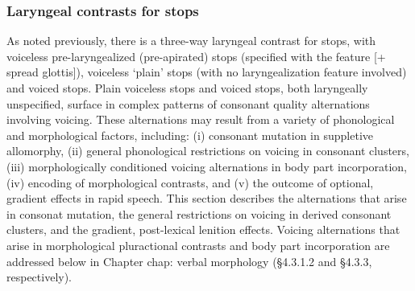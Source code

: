 


\subsubsection{Laryngeal contrasts for stops}
\label{subsubsec: laryngeal constrasts for stops}

As noted previously, there is a three-way laryngeal contrast for stops, with voiceless pre-laryngealized (pre-apirated) stops (specified with the feature [+ spread glottis]), voiceless ‘plain’ stops (with no laryngealization feature involved) and voiced stops. Plain voiceless stops and voiced stops, both laryngeally unspecified, surface in complex patterns of consonant quality alternations involving voicing. These alternations may result from a variety of phonological and morphological factors, including: (i) consonant mutation in suppletive allomorphy, (ii) general phonological restrictions on voicing in consonant clusters, (iii) morphologically conditioned voicing alternations in body part incorporation, (iv) encoding of morphological contrasts, and (v) the outcome of optional, gradient effects in rapid speech. This section describes the alternations that arise in consonat mutation, the general restrictions on voicing in derived consonant clusters, and the gradient, post-lexical lenition effects. Voicing alternations that arise in morphological pluractional contrasts and body part incorporation are addressed below in Chapter {chap: verbal morphology} (§4.3.1.2 and §4.3.3, respectively).


